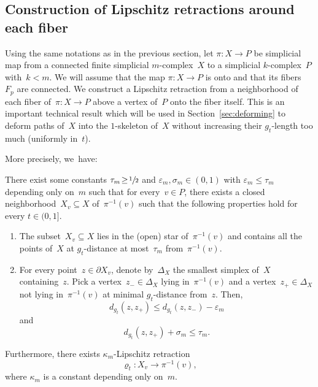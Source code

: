 \subsection{Construction of Lipschitz retractions around each fiber}

Using the same notations as in the previous section, let $\pi:X \to P$ be simplicial map from a connected finite simplicial $m$\nobreakdash-complex~$X$ to a simplicial $k$-complex~$P$ with~$k<m$.
We will assume that the map $\pi:X \to P$ is onto and that its fibers~$F_p$ are connected.
We construct a Lipschitz retraction from a neighborhood of each fiber of~$\pi:X \to P$ above a vertex of~$P$ onto the fiber itself.
This is an important technical result which will be used in Section~\ref{sec:deforming} to deform paths of~$X$ into the $1$-skeleton of~$X$ without increasing their $g_t$-length too much (uniformly in~$t$).

More precisely, we~have:

\begin{lemma} \label{lem:Xv}
There exist some constants $\tau_m \!\geq\! \sfrac{1}{2}$ and $\varepsilon_m, \sigma_m \!\in\! (0,1)$ with $\varepsilon_m \!\leq\! \tau_m$ depending only on~$m$ such that for every~$v \in P$, there exists a closed neighborhood~$X_v \subseteq X$ of~$\pi^{-1}(v)$ such that the following properties hold for every $t \in (0,1]$.
\begin{enumerate}
\item\label{lem:Xv1} The subset~$X_v \subseteq X$ lies in the (open) star of~$\pi^{-1}(v)$ and contains all the points of~$X$ at $g_t$-distance at most~$\tau_m$ from~$\pi^{-1}(v)$.
\item\label{lem:Xv2} For every point~$z \in \partial X_v$, denote by~$\Delta_X$ the smallest simplex of~$X$ containing~$z$.
Pick a vertex~$z_- \in \Delta_X$ lying in~$\pi^{-1}(v)$ and a vertex~$z_+ \in \Delta_X$ not lying in~$\pi^{-1}(v)$ at minimal $g_t$-distance from~$z$.
Then,
\begin{equation} \label{eq:z}
d_{g_t}(z,z_+) \leq d_{g_t}(z,z_-) - \varepsilon_m
\end{equation}
and
\begin{equation} \label{eq:zz}
d_{g_t}(z,z_+) + \sigma_m \leq \tau_m.
\end{equation}
\end{enumerate}

Furthermore, there exists $\kappa_m$-Lipschitz retraction
\[
\varrho_t:X_v \to \pi^{-1}(v),
\]
where $\kappa_m$ is a constant depending only on~$m$.
\end{lemma}

